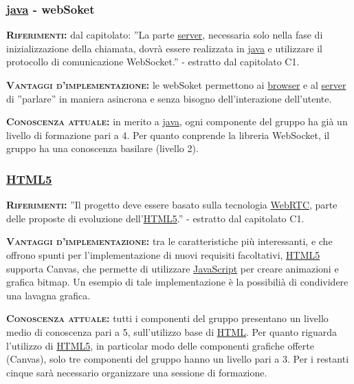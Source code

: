 \subsubsection{\underline{java} - webSoket}
\begin{description}
	\item{\scshape\bfseries Riferimenti:} dal capitolato: ''La parte \underline{server}, necessaria solo nella fase di inizializzazione della chiamata, dovrà essere realizzata in \underline{java} e utilizzare il protocollo di comunicazione WebSocket.'' - estratto dal capitolato C1.
	
	\item{\scshape\bfseries Vantaggi d'implementazione:} le webSoket permettono ai \underline{browser} e al \underline{server} di ''parlare'' in maniera asincrona e senza bisogno dell'interazione dell'utente.

	\item{\scshape\bfseries Conoscenza attuale:} in merito a \underline{java}, ogni componente del gruppo ha già un livello di formazione pari a 4. Per quanto conprende la libreria  WebSocket, il gruppo ha una conoscenza basilare (livello 2).  
\end{description}

\subsubsection{\underline{HTML5}}
\begin{description}
	\item{\scshape\bfseries Riferimenti:} ''Il progetto deve essere basato sulla tecnologia \underline{WebRTC}, parte delle proposte di evoluzione dell'\underline{HTML5}.'' - estratto dal capitolato C1.
	
	\item{\scshape\bfseries Vantaggi d'implementazione:} tra le caratteristiche più interessanti, e che offrono spunti per l'implementazione di nuovi requisiti facoltativi, \underline{HTML5} supporta Canvas, che permette di utilizzare \underline{JavaScript} per creare animazioni e grafica bitmap. Un esempio di tale implementazione è la possibilià di condividere una lavagna grafica.
	
	\item{\scshape\bfseries Conoscenza attuale:} tutti i componenti del gruppo presentano un livello medio di conoscenza pari a 5, sull'utilizzo base di \underline{HTML}. Per quanto riguarda l'utilizzo di \underline{HTML5}, in particolar modo delle componenti grafiche offerte (Canvas), solo tre componenti del gruppo hanno un livello pari a 3. Per i restanti cinque sarà necessario organizzare una sessione di formazione.
\end{description}

